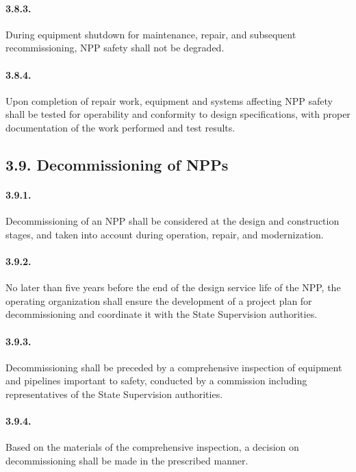 \documentclass[openright]{bookest}
\begin{document}
\paragraph{3.8.3.}
During equipment shutdown for maintenance, repair, and subsequent recommissioning, NPP safety shall not be degraded.

\paragraph{3.8.4.}
Upon completion of repair work, equipment and systems affecting NPP safety shall be tested for operability and conformity to design specifications, with proper documentation of the work performed and test results.

\subsection*{3.9. Decommissioning of NPPs}

\paragraph{3.9.1.}
Decommissioning of an NPP shall be considered at the design and construction stages, and taken into account during operation, repair, and modernization.

\paragraph{3.9.2.}
No later than five years before the end of the design service life of the NPP, the operating organization shall ensure the development of a project plan for decommissioning and coordinate it with the State Supervision authorities.

\paragraph{3.9.3.}
Decommissioning shall be preceded by a comprehensive inspection of equipment and pipelines important to safety, conducted by a commission including representatives of the State Supervision authorities.

\paragraph{3.9.4.}
Based on the materials of the comprehensive inspection, a decision on decommissioning shall be made in the prescribed manner.
\end{document}

